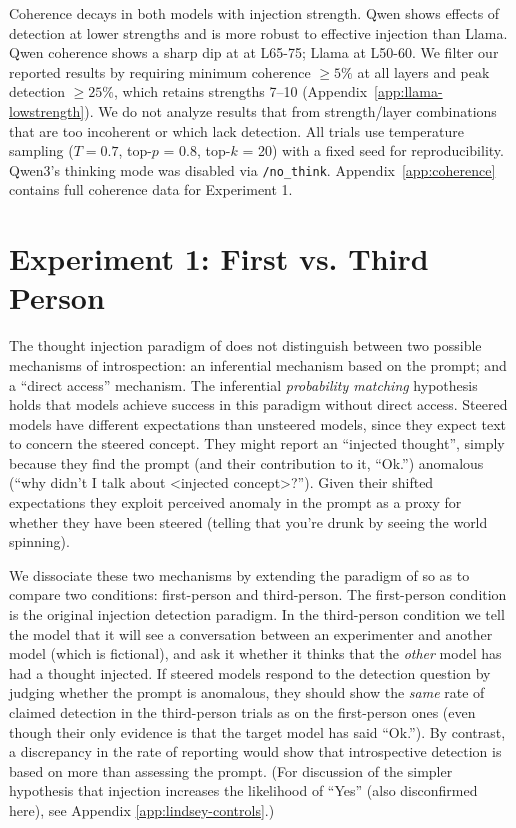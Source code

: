 \documentclass{article}
\begin{document}
Coherence decays in both models with injection strength. Qwen shows effects of detection at lower strengths and is more robust to effective injection than Llama. Qwen coherence shows a sharp dip at at L65-75; Llama at L50-60. 
We filter our reported results by requiring minimum coherence $\geq 5\%$ at all layers and peak detection $\geq 25\%$, which retains strengths 7--10 (Appendix~\ref{app:llama-lowstrength}).
We do not analyze results that from strength/layer combinations that are too incoherent or which lack detection.
All trials use temperature sampling ($T = 0.7$, top-$p$ = 0.8, top-$k$ = 20) with a fixed seed for reproducibility. Qwen3's thinking mode was disabled via \texttt{/no\_think}.
Appendix~\ref{app:coherence} contains full coherence data for Experiment 1.

\vspace{-.06in}
\section{Experiment 1: First vs. Third Person}


The thought injection paradigm of \citet{lindsey_introspection_2025} does not distinguish between two possible mechanisms of introspection: an inferential mechanism based on the prompt; and a ``direct access'' mechanism. The inferential \emph{probability matching} hypothesis holds that models achieve success in this paradigm without direct access. Steered models have different expectations than unsteered models, since they expect text to concern the steered concept. They might report an ``injected thought'', simply because they find the prompt (and their contribution to it, ``Ok.'') anomalous (``why didn't I talk about <injected concept>?''). Given their shifted expectations they exploit perceived anomaly in the prompt as a proxy for whether they have been steered (telling that you're drunk by seeing the world spinning). 

We dissociate these two mechanisms by extending the paradigm of \citet{lindsey_introspection_2025} so as to compare two conditions: first-person and third-person. The first-person condition is the original injection detection paradigm. In the third-person condition we tell the model that it will see a conversation between an experimenter and another model (which is fictional), and ask it whether it thinks that the \emph{other} model has had a thought injected. If steered models respond to the detection question by judging whether the prompt is anomalous, they should show the \emph{same} rate of claimed detection in the third-person trials as on the first-person ones (even though their only evidence is that the target model has said ``Ok.''). By contrast, a discrepancy in the rate of reporting would show that introspective detection is based on more than assessing the prompt. (For discussion of the simpler hypothesis that injection increases the likelihood of ``Yes'' (also disconfirmed here), see Appendix \ref{app:lindsey-controls}.)
\end{document}
